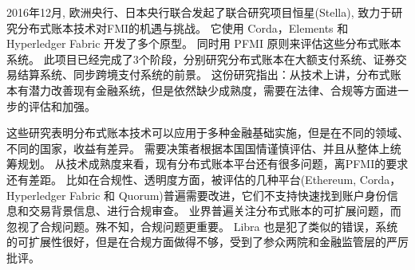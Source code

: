 
2016年12月, 欧洲央行、日本央行联合发起了联合研究项目恒星(Stella), 致力于研究分布式账本技术对FMI的机遇与挑战。
它使用 Corda，Elements 和 Hyperledger Fabric 开发了多个原型。
同时用 PFMI 原则来评估这些分布式账本系统。
此项目已经完成了3个阶段，分别研究分布式账本在大额支付系统\cite{stellar1}、证券交易结算系统\cite{stellar2}、同步跨境支付系统\cite{stellar3}的前景。
这份研究指出：从技术上讲，分布式账本有潜力改善现有金融系统，但是依然缺少成熟度，需要在法律、合规等方面进一步的评估和加强。


这些研究表明分布式账本技术可以应用于多种金融基础实施，但是在不同的领域、不同的国家，收益有差异。
需要决策者根据本国国情谨慎评估、并且从整体上统筹规划。
从技术成熟度来看，现有分布式账本平台还有很多问题，离PFMI的要求还有差距。
比如在合规性、透明度方面，被评估的几种平台(Ethereum, Corda，Hyperledger Fabric 和 Quorum)普遍需要改进，它们不支持快速找到账户身份信息和交易背景信息、进行合规审查。
业界普遍关注分布式账本的可扩展问题，而忽视了合规问题。殊不知，合规问题更重要。
Libra 也是犯了类似的错误，系统的可扩展性很好，但是在合规方面做得不够，受到了参众两院和金融监管层的严厉批评。

